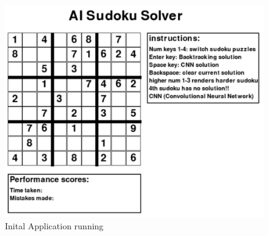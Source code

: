 \documentclass[]{final_report}
\begin{document}
\begin{figure}[ht]
    \centering 
    \begin{minipage}{0.7\textwidth} 
        \includegraphics[width=\textwidth]{images/Final unsolved.png} 
        \caption{Inital Application running} 
        \label{fig: unsolved grid} 
    \end{minipage} 
    \hfill 
\end{figure}
\end{document}
